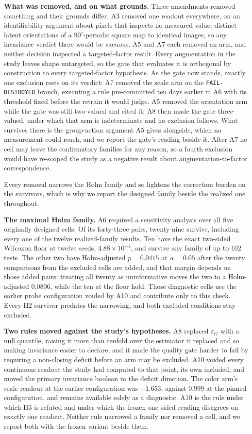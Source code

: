 \documentclass[10pt]{article}
\newcommand{\epsG}{\varepsilon_G}
\begin{document}
\textbf{What was removed, and on what grounds.} Three amendments removed something and their
grounds differ. A3 removed one readout everywhere, on an identifiability argument about pixels that
inspects no measured value: distinct latent orientations of a $90^\circ$-periodic square map to
identical images, so any invariance verdict there would be vacuous. A5 and A7 each removed an arm,
and neither decision inspected a targeted-factor result. Every augmentation in the study leaves
shape untargeted, so the gate that evaluates it is orthogonal by construction to every
targeted-factor hypothesis. As the gate now stands, exactly one exclusion rests on its verdict: A7
removed the scale arm on the \texttt{FAIL-DESTROYED} branch, executing a rule pre-committed ten days
earlier in A6 with its threshold fixed before the retrain it would judge. A5 removed the orientation
arm while the gate was still two-valued and cited it; A8 then made the gate three-valued, under
which that arm is indeterminate and no exclusion follows. What survives there is the group-action
argument A5 gives alongside, which no measurement could reach, and we report the gate's reading
beside it. After A7 no cell may leave the confirmatory families for any reason, so a fourth
exclusion would have re-scoped the study as a negative result about augmentation-to-factor
correspondence.

Every removal narrows the Holm family and so lightens the correction burden on the survivors, which
is why we report the designed family beside the realized one throughout.

\textbf{The maximal Holm family.} A6 required a sensitivity analysis over all five originally
designed cells. Of its
forty-three pairs, twenty-nine survive, including every one of the twelve realized-family results.
Ten have the exact two-sided Wilcoxon floor at twelve seeds, $4.88\times10^{-4}$, and survive any
family of up to $102$ tests. The other two have Holm-adjusted $p=0.0415$ at $\alpha=0.05$ after the
twenty comparisons from the excluded cells are added, and that margin depends on those added pairs:
treating all twenty as uninformative moves the two to a Holm-adjusted
$0.0806$, while the ten at the floor hold. Those diagnostic cells use the earlier probe
configuration voided by A10 and contribute only to this check. Every H2 survivor predates the
narrowing, and both excluded conditions stay excluded.

\textbf{Two rules moved against the study's hypotheses.} A8 replaced $\epsG$ with a null quantile,
raising it more than tenfold over the estimator it replaced and so making invariance easier to
declare, and it made the quality gate harder to fail by requiring a non-closing deficit before an
arm may be excluded. A10 voided every continuous readout the study had computed to that point, its
own included, and moved the primary invariance boolean to the deficit direction. The color arm's
scale readout at the earlier configuration was $-1.653$, against $0.999$ at the pinned
configuration, and remains available solely as a diagnostic. A10 is the rule
under which H3 is refuted and under which the frozen one-sided reading disagrees on exactly one
readout. Neither rule narrowed a family nor removed a cell, and we report both with the frozen
variant beside them.
\end{document}
